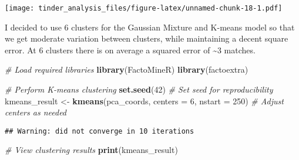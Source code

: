 \documentclass[
]{article}
\newenvironment{Shaded}{\begin{snugshade}}{\end{snugshade}}
\newcommand{\AttributeTok}[1]{\textcolor[rgb]{0.13,0.29,0.53}{#1}}
\newcommand{\CommentTok}[1]{\textcolor[rgb]{0.56,0.35,0.01}{\textit{#1}}}
\newcommand{\DecValTok}[1]{\textcolor[rgb]{0.00,0.00,0.81}{#1}}
\newcommand{\FunctionTok}[1]{\textcolor[rgb]{0.13,0.29,0.53}{\textbf{#1}}}
\newcommand{\NormalTok}[1]{#1}
\newcommand{\OtherTok}[1]{\textcolor[rgb]{0.56,0.35,0.01}{#1}}
\newcommand{\SpecialCharTok}[1]{\textcolor[rgb]{0.81,0.36,0.00}{\textbf{#1}}}
\newcommand{\StringTok}[1]{\textcolor[rgb]{0.31,0.60,0.02}{#1}}
\begin{document}
\begin{Shaded}
\end{Shaded}

\texttt{[image: tinder\_analysis\_files/figure-latex/unnamed-chunk-18-1.pdf]}

I decided to use 6 clusters for the Gaussian Mixture and K-means model
so that we get moderate variation between clusters, while maintaining a
decent square error. At 6 clusters there is on average a squared error
of \textasciitilde3 matches.

\begin{Shaded}
\begin{Highlighting}[]
\CommentTok{\# Load required libraries}
\FunctionTok{library}\NormalTok{(FactoMineR)}
\FunctionTok{library}\NormalTok{(factoextra)}

\CommentTok{\# Perform K{-}means clustering}
\FunctionTok{set.seed}\NormalTok{(}\DecValTok{42}\NormalTok{)  }\CommentTok{\# Set seed for reproducibility}
\NormalTok{kmeans\_result }\OtherTok{\textless{}{-}} \FunctionTok{kmeans}\NormalTok{(pca\_coords, }\AttributeTok{centers =} \DecValTok{6}\NormalTok{, }\AttributeTok{nstart =} \DecValTok{250}\NormalTok{)  }\CommentTok{\# Adjust \textquotesingle{}centers\textquotesingle{} as needed}
\end{Highlighting}
\end{Shaded}

\begin{verbatim}
## Warning: did not converge in 10 iterations
\end{verbatim}

\begin{Shaded}
\begin{Highlighting}[]
\CommentTok{\# View clustering results}
\FunctionTok{print}\NormalTok{(kmeans\_result)}
\end{Highlighting}
\end{Shaded}
\end{document}
